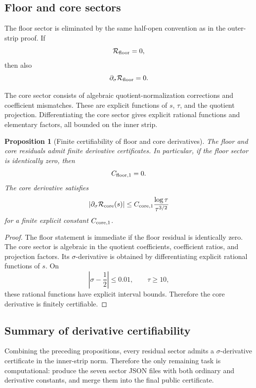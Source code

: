 \documentclass[11pt]{article}
\newtheorem{proposition}[theorem]{Proposition}
\begin{document}
\subsection{Floor and core sectors}

The floor sector is eliminated by the same half-open convention as in the
outer-strip proof.  If
\[
        \mathcal R_{\rm floor}=0,
\]
then also
\[
        \partial_\sigma\mathcal R_{\rm floor}=0.
\]

The core sector consists of algebraic quotient-normalization corrections and
coefficient mismatches.  These are explicit functions of \(s\), \(\tau\), and
the quotient projection.  Differentiating the core sector gives explicit
rational functions and elementary factors, all bounded on the inner strip.

\begin{proposition}[Finite certifiability of floor and core derivatives]
\label{prop:floor-core-derivative-certifiable}
The floor and core residuals admit finite derivative certificates.  In
particular, if the floor sector is identically zero, then
\[
        C_{{\rm floor},1}=0.
\]
The core derivative satisfies
\[
        |\partial_\sigma\mathcal R_{\rm core}(s)|
        \le
        C_{{\rm core},1}
        \frac{\log\tau}{\tau^{3/2}}
\]
for a finite explicit constant \(C_{{\rm core},1}\).
\end{proposition}

\begin{proof}
The floor statement is immediate if the floor residual is identically zero.
The core sector is algebraic in the quotient coefficients, coefficient ratios,
and projection factors.  Its \(\sigma\)-derivative is obtained by differentiating
explicit rational functions of \(s\).  On
\[
        \left|\sigma-\frac12\right|\le0.01,
        \qquad
        \tau\ge10,
\]
these rational functions have explicit interval bounds.  Therefore the core
derivative is finitely certifiable.
\end{proof}

\subsection{Summary of derivative certifiability}

Combining the preceding propositions, every residual sector admits a
\(\sigma\)-derivative certificate in the inner-strip norm.  Therefore the only
remaining task is computational: produce the seven sector JSON files with both
ordinary and derivative constants, and merge them into the final public
certificate.
\end{document}
